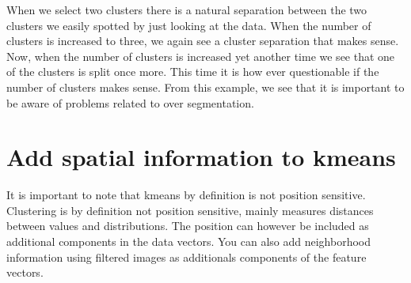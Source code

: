\documentclass[letterpaper,10pt,english]{sphinxmanual}
\begin{document}
\begin{sphinxVerbatim}[commandchars=\\\{\}]
   

    
          
    \PYG{p}{[}\PYG{p}{]}  
    \PYG{p}{[}\PYG{p}{]}
\end{sphinxVerbatim}

\noindent{}

When we select two clusters there is a natural separation between the two clusters we easily spotted by just looking at the data. When the number of clusters is increased to three, we again see a cluster separation that makes sense. Now, when the number of clusters is increased yet another time we see that one of the clusters is split once more. This time it is how ever questionable if the number of clusters makes sense. From this example, we see that it is important to be aware of problems related to over segmentation.


\section{Add spatial information to k\sphinxhyphen{}means}
\label{\detokenize{ML4NeutronImageSegmentation:add-spatial-information-to-k-means}}
It is important to note that k\sphinxhyphen{}means by definition is not position sensitive. Clustering is by definition not position sensitive, mainly measures distances between values and distributions. The position can however be included as additional components in the data vectors. You can also add neighborhood information using filtered images as additionals components of the feature vectors.
\end{document}
